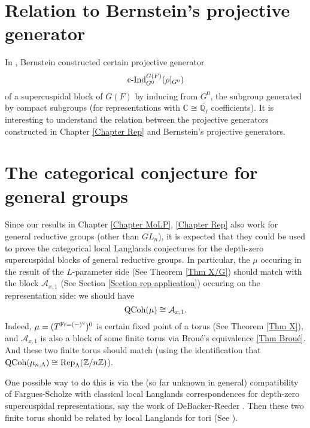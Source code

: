\section{Relation to Bernstein's projective generator}

In \cite[p46, Section 3.3]{bernsteindraft}, Bernstein constructed certain projective generator $$\operatorname{\operatorname{c-Ind}}_{G^0}^{G(F)}(\rho|_{G^0})$$
of a supercuspidal block of $G(F)$ by inducing from $G^0$, the subgroup generated by compact subgroups (for representations with $\mathbb{C} \cong \overline{\mathbb{Q}_{\ell}}$ coefficients). It is interesting to understand the relation between the projective generators constructed in Chapter \ref{Chapter Rep} and Bernstein's projective generators.

\section{The categorical conjecture for general groups}

Since our results in Chapter \ref{Chapter MoLP}, \ref{Chapter Rep} also work for general reductive groups (other than $GL_n$), it is expected that they could be used to prove the categorical local Langlands conjectures for the depth-zero supercuspidal blocks of general reductive groups. In particular, the $\mu$ occuring in the result
of the $L$-parameter side (See Theorem \ref{Thm X/G}) should match with the block $\mathcal{A}_{x,1}$ (See Section \ref{Section rep application}) occuring on the representation side: we should have
$$\operatorname{\operatorname{QCoh}}(\mu) \cong \mathcal{A}_{x,1}.$$
Indeed, $\mu=(T^{\operatorname{Fr}=(-)^q})^0$ is certain fixed point of a torus (See Theorem \ref{Thm X}), and $\mathcal{A}_{x,1}$ is also a block of some finite torus via Broué's equivalence \ref{Thm Broué}. And these two finite torus should match (using the identification that $\operatorname{\operatorname{QCoh}}(\mu_{n, \Lambda}) \cong \operatorname{\operatorname{Rep}}_{\Lambda}(\mathbb{Z}/n\mathbb{Z})$).

One possible way to do this is via the (so far unknown in general) compatibility of Fargues-Scholze with classical local Langlands correspondences for depth-zero supercuspidal representations, say the work of DeBacker-Reeder \cite{debacker2009depth}. Then these two finite torus should be related by local Langlands for tori (See \cite[Section 4.3]{debacker2009depth}). 


	
